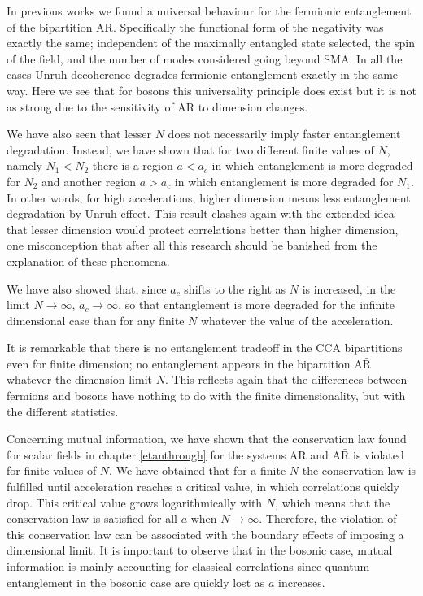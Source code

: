 In previous works we found a universal behaviour for the fermionic entanglement of the bipartition AR. Specifically the functional form of the negativity was exactly the same; independent of the maximally entangled state selected, the spin of the field, and the number of modes considered going beyond SMA. In all the cases Unruh decoherence degrades fermionic entanglement exactly in the same way. Here we see that for bosons this universality principle does exist but it is not as strong due to the sensitivity of AR to dimension changes. 

We have also seen that lesser $N$ does not necessarily imply faster entanglement degradation. Instead, we have shown that for two different finite values of $N$, namely $N_1<N_2$ there is a region $a<a_c$ in which entanglement is more degraded for $N_2$ and another region $a>a_c$ in which entanglement is more degraded for $N_1$. In other words, for high accelerations, higher dimension means less entanglement degradation by Unruh effect. This result clashes again with the extended idea that lesser dimension would protect correlations better than higher dimension, one misconception that after all this research should be banished from the explanation of these phenomena.

We have also showed that, since $a_c$ shifts to the right as $N$ is increased, in the limit $N\rightarrow\infty$, $a_c\rightarrow\infty$, so that entanglement is more degraded for the infinite dimensional case than for any finite $N$ whatever the value of the acceleration.

It is remarkable that there is no entanglement tradeoff in the CCA bipartitions even for finite dimension; no entanglement appears in the bipartition $\text{A}{\bar{\text{R}}}$ whatever the dimension limit $N$. This reflects again that the differences between fermions and bosons have nothing to do with the finite dimensionality, but with the different statistics. 

Concerning mutual information, we have shown that the conservation law found for scalar fields in chapter \ref{etanthrough} for the systems AR and $\text{A}{\bar{\text{R}}}$ is violated for finite values of $N$. We have obtained that for a finite $N$ the conservation law is fulfilled until acceleration reaches a critical value, in which correlations quickly drop. This critical value grows logarithmically with $N$, which means that the conservation law is satisfied for all $a$ when $N\rightarrow\infty$. Therefore, the violation of this conservation law can be associated with the boundary effects of imposing a dimensional limit. It is important to observe that in the bosonic case, mutual information is mainly accounting for classical correlations since quantum entanglement in the bosonic case are quickly lost as $a$ increases.


